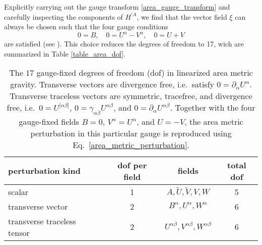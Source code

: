 Explicitly carrying out the gauge transform \eqref{area_gauge_transform} and carefully inspecting the components of $H^{\prime A}$, we find that the vector field $\xi$ can always be chosen such that the four gauge conditions
\begin{equation}
  0 = B,\quad 0 = U^\alpha - V^\alpha,\quad 0 = U + V
\end{equation}
are satisfied (see \cite{Schneider_2017}). This choice reduces the degrees of freedom to 17, wich are summarized in Table \ref{table_area_dof}.
\begin{table}
  \centering
  \begin{tabular}{l c c c}
    \toprule
    perturbation kind & dof per field & fields & total dof \\
    \midrule
    scalar & 1 & $A,\tilde U,\tilde V,V,W$ & 5 \\
    transverse vector & 2 & $B^\alpha,U^\alpha,W^\alpha$ & 6 \\
    transverse traceless tensor & 2 & $U^{\alpha\beta},V^{\alpha\beta},W^{\alpha\beta}$ & 6 \\
    \bottomrule 
  \end{tabular}
  \caption{The 17 gauge-fixed degrees of freedom (dof) in linearized area metric gravity. Transverse vectors are divergence free, i.e.~satisfy $0 = \partial_\alpha U^\alpha$. Transverse traceless vectors are symmetric, tracefree, and divergence free, i.e.~$0 = U^{\lbrack\alpha\beta\rbrack}$, $0 = \gamma_{\alpha\beta} U^{\alpha\beta}$, and $0 = \partial_\alpha U^{\alpha\beta}$. Together with the four gauge-fixed fields $B=0$, $V^\alpha = U^\alpha$, and $U=-V$, the area metric perturbation in this particular gauge is reproduced using Eq.~\eqref{area_metric_perturbation}.}
\end{table}

